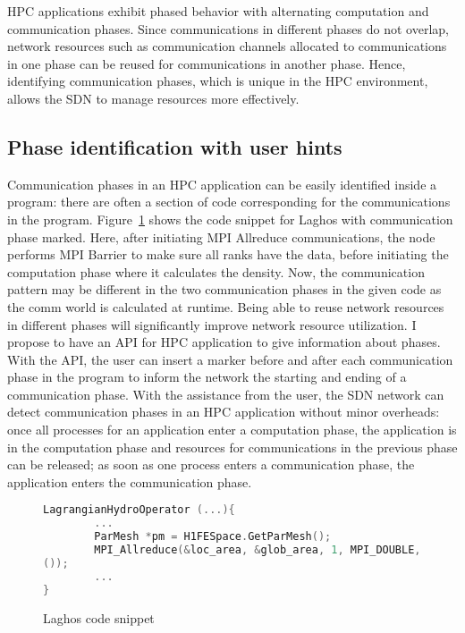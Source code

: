 
HPC applications exhibit phased behavior with alternating
computation and communication phases. Since communications in different
phases do not overlap, network resources such as communication channels
allocated to communications in one phase can be reused for communications
in another phase. Hence, identifying communication phases, which is unique
in the HPC environment, allows the SDN to manage resources more effectively.

\subsection{Phase identification with user hints}

Communication phases in an HPC application can be easily identified
inside a program: there are often a section of code corresponding
for the communications in the program. Figure~\ref{code.laghos.1}
shows the code snippet for Laghos with communication phase marked. 
Here, after initiating MPI Allreduce
communications, the node performs MPI Barrier to make sure all ranks 
have the data, before initiating the computation phase where
it calculates the density.
Now, the communication pattern may be different in the two
communication phases in the given code as the comm world is calculated
at runtime. Being able to reuse network resources in different phases will
significantly improve network resource utilization. 
I propose to have an API for HPC application to give
information about phases. With the API, the user can insert a marker before
and after each communication
phase in the program to inform the network the starting and
ending of a communication phase. With the assistance from the user,
the SDN network can detect communication phases in an HPC application
without minor overheads: once all processes for an application
enter a computation phase, the application is in the computation phase and
resources for communications in the previous phase can be released; as
soon as one process enters a communication phase, the application enters
the communication phase. 

\begin{figure}[H]
\begin{lstlisting}[breaklines, language=C++, frame=single, tabsize=4, basicstyle=\ttfamily]
LagrangianHydroOperator (...){
        ...
        ParMesh *pm = H1FESpace.GetParMesh();
        MPI_Allreduce(&loc_area, &glob_area, 1, MPI_DOUBLE, MPI_SUM, pm->GetComm
());
        ...
}
\end{lstlisting}
\caption{Laghos code snippet}
\label{code.laghos.1}
\end{figure}

